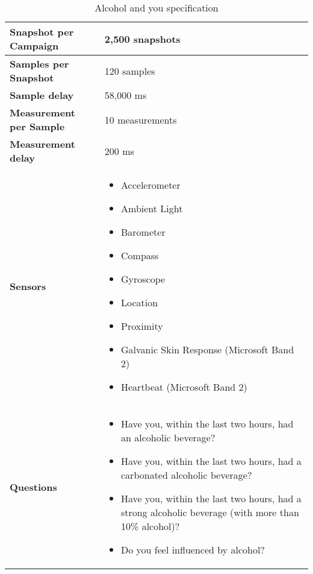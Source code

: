 \begin{table}[!htbp]
    \centering
	\begin{tabular}{|m{}|m{}|} 
  \hline
  \textbf{Snapshot per Campaign}    & 2,500 snapshots   \\ \hline
  \textbf{Samples per Snapshot}     & 120 samples       \\ \hline
  \textbf{Sample delay}             & 58,000 ms         \\ \hline
  \textbf{Measurement per Sample}   & 10 measurements   \\ \hline
  \textbf{Measurement delay}        & 200 ms            \\ \hline
  \textbf{Sensors}                  & \begin{itemize}[noitemsep]
                \item Accelerometer 
                \item Ambient Light
                \item Barometer
                \item Compass
                \item Gyroscope
                \item Location
                \item Proximity
                \item Galvanic Skin Response (Microsoft Band 2)
                \item Heartbeat (Microsoft Band 2)
              \end{itemize}                             \\ \hline
	\textbf{Questions}                & \begin{itemize}[noitemsep]
								\item Have you, within the last two hours, had an alcoholic beverage?
								\item Have you, within the last two hours, had a carbonated alcoholic beverage?
								\item Have you, within the last two hours, had a strong alcoholic beverage (with more than 10\% alcohol)?
								\item Do you feel influenced by alcohol?
							\end{itemize}                             \\ \hline
	\end{tabular}
	\caption{Alcohol and you specification}
	\label{tab:test_campaign_spec}
\end{table}
\FloatBarrier

